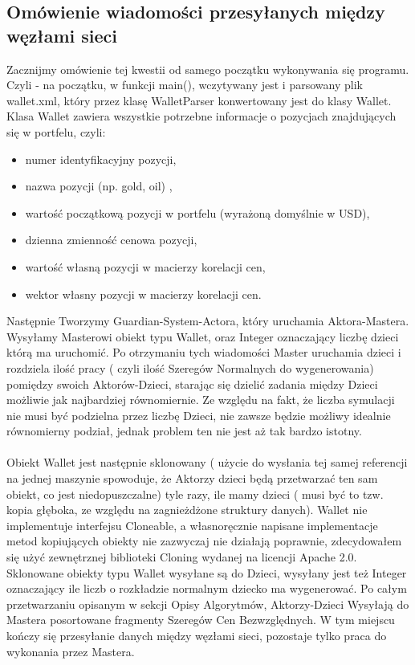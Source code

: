 \documentclass[11pt,titlepage]{article}
\begin{document}
\subsection{Omówienie wiadomości przesyłanych między węzłami sieci}

Zacznijmy omówienie tej kwestii od samego początku wykonywania się programu. Czyli - na początku, w funkcji main(), wczytywany jest i parsowany plik wallet.xml, który przez klasę WalletParser konwertowany jest do klasy Wallet. Klasa Wallet zawiera wszystkie potrzebne informacje o pozycjach znajdujących się w portfelu, czyli:
\begin{itemize}
  \item numer identyfikacyjny pozycji,
	\item nazwa pozycji (np. gold, oil) ,
	\item wartość początkową pozycji w portfelu (wyrażoną domyślnie w USD),
	\item dzienna zmienność cenowa pozycji,
	\item wartość własną pozycji w macierzy korelacji cen,
	\item wektor własny pozycji w macierzy korelacji cen.

\end{itemize}

Następnie Tworzymy Guardian-System-Actora, który uruchamia Aktora-Mastera. Wysyłamy Masterowi  obiekt typu Wallet, oraz Integer oznaczający liczbę dzieci którą ma uruchomić. Po otrzymaniu tych wiadomości Master uruchamia dzieci i rozdziela ilość pracy ( czyli ilość Szeregów Normalnych do wygenerowania) pomiędzy swoich Aktorów-Dzieci, starając się dzielić zadania między Dzieci możliwie jak najbardziej równomiernie. Ze względu na fakt, że liczba symulacji nie musi być podzielna przez liczbę Dzieci, nie zawsze będzie możliwy idealnie równomierny podział, jednak problem ten nie jest aż tak bardzo istotny. \\
\\
Obiekt Wallet jest następnie sklonowany ( użycie do wysłania tej samej referencji na jednej maszynie spowoduje, że Aktorzy dzieci będą przetwarzać ten sam obiekt, co jest niedopuszczalne) tyle razy, ile mamy dzieci ( musi być to tzw. kopia głęboka, ze względu na zagnieżdżone struktury danych). Wallet nie implementuje interfejsu Cloneable, a własnoręcznie napisane implementacje metod kopiujących obiekty nie zazwyczaj nie działają poprawnie, zdecydowałem się użyć zewnętrznej biblioteki Cloning wydanej na licencji Apache 2.0. Sklonowane obiekty typu Wallet wysyłane są do Dzieci, wysyłany jest też Integer oznaczający ile liczb o rozkładzie normalnym dziecko ma wygenerować. Po całym przetwarzaniu opisanym w sekcji Opisy Algorytmów, Aktorzy-Dzieci Wysyłają do Mastera posortowane fragmenty Szeregów Cen Bezwzględnych. W tym miejscu kończy się przesyłanie danych między węzłami sieci, pozostaje tylko praca do wykonania przez Mastera.
\end{document}
